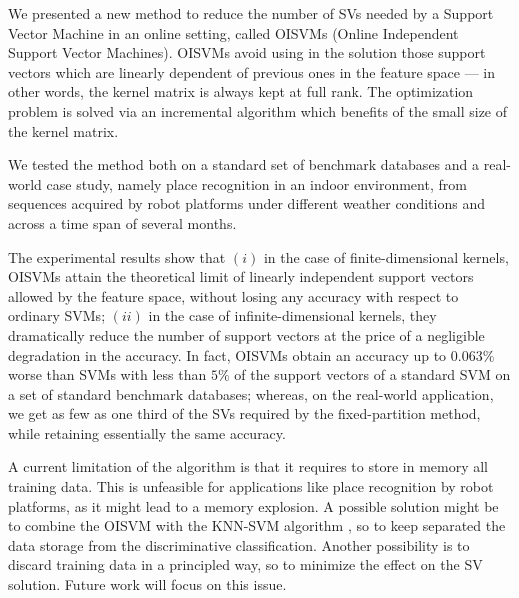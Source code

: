 We presented a new method to reduce the number of SVs needed by a
Support Vector Machine in an online setting, called OISVMs (Online
Independent Support Vector Machines). OISVMs avoid using in the
solution those support vectors which are linearly dependent of
previous ones in the feature space --- in other words, the kernel
matrix is always kept at full rank. The optimization problem is solved
via an incremental algorithm which benefits of the small size of the
kernel matrix.

We tested the method both on a standard set of benchmark databases and
a real-world case study, namely place recognition in an indoor
environment, from sequences acquired by robot platforms under
different weather conditions and across a time span of several months.

The experimental results show that $(i)$ in the case of
finite-dimensional kernels, OISVMs attain the theoretical limit of
linearly independent support vectors allowed by the feature space,
without losing any accuracy with respect to ordinary SVMs; $(ii)$ in
the case of infinite-dimensional kernels, they dramatically reduce the
number of support vectors at the price of a negligible degradation in
the accuracy. In fact, OISVMs obtain an accuracy up to $0.063\%$ worse
than SVMs with less than $5\%$ of the support vectors of a standard
SVM on a set of standard benchmark databases; whereas, on the
real-world application, we get as few as one third of the SVs required
by the fixed-partition method, while retaining essentially the same
accuracy.

A current limitation of the algorithm is that it requires to store in
memory all training data. This is unfeasible for applications like
place recognition by robot platforms, as it might lead to a memory
explosion. A possible solution might be to combine the OISVM with the
KNN-SVM algorithm \cite{zhang:cvpr06}, so to keep separated the data
storage from the discriminative classification. Another possibility is
to discard training data in a principled way, so to minimize the
effect on the SV solution. Future work will focus on this issue.
